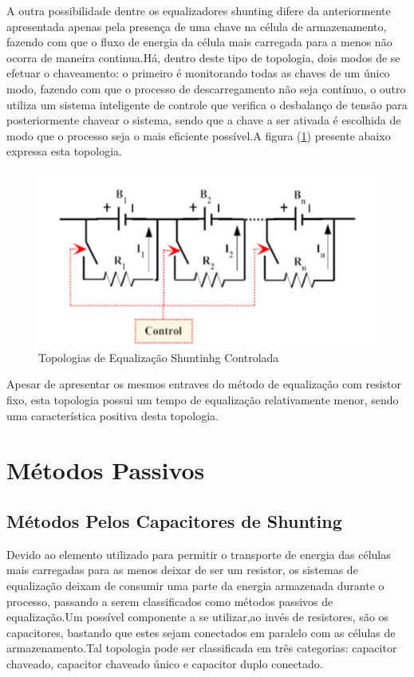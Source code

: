 \documentclass[11pt, a4paper, oneside]{article}
\begin{document}
A outra possibilidade dentre os equalizadores shunting difere da
anteriormente apresentada apenas pela presença de uma chave na célula de
armazenamento, fazendo com que o fluxo de energia da célula mais carregada para
a menos não ocorra de maneira continua.Há, dentro deste tipo de topologia, dois
modos de se efetuar o chaveamento: o primeiro é monitorando todas as chaves de
um único modo, fazendo com que o processo de descarregamento não seja
contínuo, o outro utiliza um sistema inteligente de controle que verifica o
desbalanço de tensão para posteriormente chavear o sistema, sendo que a chave a
ser ativada é escolhida de modo que o processo seja o mais eficiente possível.A
figura (\ref{fig:estrutura_equalizador_shunting_controlado}) presente abaixo expressa esta topologia.

\begin{figure}[h!]
\centering
\includegraphics[width=0.6\linewidth]{ativo_com_controle}
\caption{Topologias de Equalização Shuntinhg Controlada \cite{energy_figure}}
\label{fig:estrutura_equalizador_shunting_controlado}
\end{figure}

Apesar de apresentar os mesmos entraves do método de equalização com
resistor fixo, esta topologia possui um tempo de equalização relativamente menor,
sendo uma característica positiva desta topologia.

\section{Métodos Passivos}

\subsection{Métodos Pelos Capacitores de Shunting}
Devido ao elemento utilizado para permitir o transporte de energia das
células mais carregadas para as menos deixar de ser um resistor, os sistemas de
equalização deixam de consumir uma parte da energia armazenada durante o
processo, passando a serem classificados como métodos passivos de
equalização.Um possível componente a se utilizar,ao invés de resistores, são os
capacitores, bastando que estes sejam conectados em paralelo com as células de
armazenamento.Tal topologia pode ser classificada em três categorias: capacitor
chaveado, capacitor chaveado único e capacitor duplo conectado.
\end{document}
